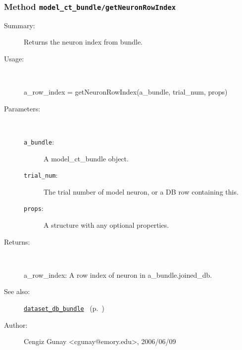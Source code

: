 \subsubsection[Method \texttt{getNeuronRowIndex}]{Method \texttt{model\_ct\_bundle/getNeuronRowIndex}}%
%
\label{ref_model_ct_bundle__getNeuronRowIndex}%
\hypertarget{ref_model_ct_bundle__getNeuronRowIndex}{}%
\begin{description}
\item[Summary:]Returns the neuron index from bundle.
%
\item[Usage:]~%
\begin{lyxcode}%
a\_row\_index = getNeuronRowIndex(a\_bundle, trial\_num, props)
%
\end{lyxcode}%
%
%
\item[Parameters:]~
\begin{description}%
\item[\texttt{a\_bundle}:]
 A model\_ct\_bundle object.
\item[\texttt{trial\_num}:]
 The trial number of model neuron, or a DB row containing this.
\item[\texttt{props}:]
 A structure with any optional properties.
\end{description}%
%
\item[Returns:
]~

	a\_row\_index: A row index of neuron in a\_bundle.joined\_db.
%
%
\item[See also:]%
\hyperlink{ref_dataset_db_bundle}{\texttt{dataset\_db\_bundle}}%
\ (p.~\pageref{ref_dataset_db_bundle})%
%
%
\item[Author:]%
Cengiz Gunay <cgunay@emory.edu>, 2006/06/09
%
\end{description}
\methodline%
